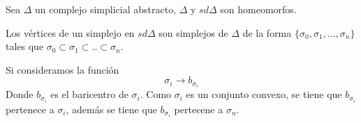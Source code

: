 \begin{Teo}
Sea $\Delta$ un complejo simplicial abstracto, $\Delta$ y $sd\Delta$ son homeomorfos.
\end{Teo}

\begin{Dem}
Los vértices de un simplejo en $sd\Delta$ son simplejos de $\Delta$ de la forma $\{\sigma_0,\sigma_1,...,\sigma_n\}$ tales que $\sigma_0\subset \sigma_1\subset..\subset\sigma_n$.

Si consideramos la función 
\begin{equation*}
\sigma_{i} \rightarrow b_{\sigma_{i}}
\end{equation*}
Donde $b_{\sigma_{i}}$ es el baricentro de $\sigma_{i}$.
Como $\sigma_{i}$ es un conjunto convexo, se tiene que $b_{\sigma_{i}}$ pertenece a $\sigma_{i}$, además se tiene que $b_{\sigma_{i}}$ pertecene a $\sigma_{n}$.
\end{Dem}
